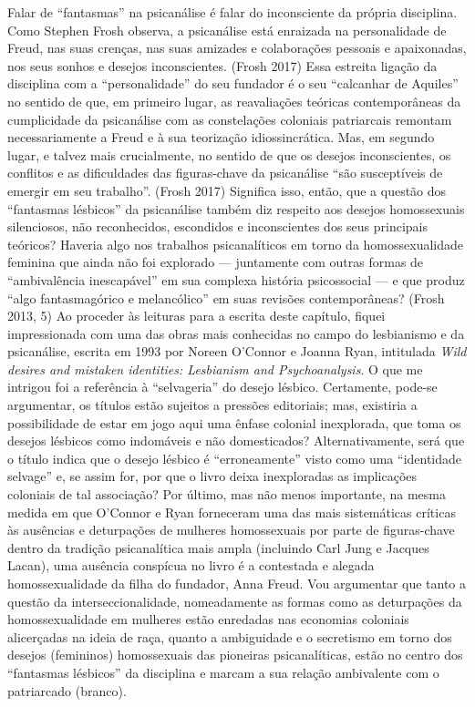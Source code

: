 Falar de ``fantasmas'' na psicanálise é falar do inconsciente da própria
disciplina. Como Stephen Frosh observa, a psicanálise está enraizada na
personalidade de Freud, nas suas crenças, nas suas amizades e
colaborações pessoais e apaixonadas, nos seus sonhos e desejos
inconscientes. (Frosh 2017) Essa estreita ligação da disciplina com a
``personalidade'' do seu fundador é o seu ``calcanhar de Aquiles'' no
sentido de que, em primeiro lugar, as reavaliações teóricas
contemporâneas da cumplicidade da psicanálise com as constelações
coloniais patriarcais remontam necessariamente a Freud e à sua
teorização idiossincrática. Mas, em segundo lugar, e talvez mais
crucialmente, no sentido de que os desejos inconscientes, os conflitos e
as dificuldades das figuras-chave da psicanálise ``são susceptíveis de
emergir em seu trabalho''. (Frosh 2017) Significa isso, então, que a
questão dos ``fantasmas lésbicos'' da psicanálise também diz respeito aos
desejos homossexuais silenciosos, não reconhecidos, escondidos e
inconscientes dos seus principais teóricos? Haveria algo nos trabalhos
psicanalíticos em torno da homossexualidade feminina que ainda não foi
explorado --- juntamente com outras formas de ``ambivalência inescapável''
em sua complexa história psicossocial --- e que produz ``algo
fantasmagórico e melancólico'' em suas revisões contemporâneas? (Frosh
2013, 5) Ao proceder às leituras para a escrita deste capítulo, fiquei
impressionada com uma das obras mais conhecidas no campo do lesbianismo
e da psicanálise, escrita em 1993 por Noreen O'Connor e Joanna Ryan,
intitulada \emph{Wild desires and mistaken identities: Lesbianism and
Psychoanalysis}. O que me intrigou foi a referência à ``selvageria'' do
desejo lésbico. Certamente, pode-se argumentar, os títulos estão
sujeitos a pressões editoriais; mas, existiria a possibilidade de estar
em jogo aqui uma ênfase colonial inexplorada, que toma os desejos
lésbicos como indomáveis e não domesticados? Alternativamente, será que
o título indica que o desejo lésbico é ``erroneamente'' visto como uma
``identidade selvage'' e, se assim for, por que o livro deixa
inexploradas as implicações coloniais de tal associação? Por último, mas
não menos importante, na mesma medida em que O'Connor e Ryan forneceram
uma das mais sistemáticas críticas às ausências e deturpações de
mulheres homossexuais por parte de figuras-chave dentro da tradição
psicanalítica mais ampla (incluindo Carl Jung e Jacques Lacan), uma
ausência conspícua no livro é a contestada e alegada homossexualidade da
filha do fundador, Anna Freud. Vou argumentar que tanto a questão da
interseccionalidade, nomeadamente as formas como as deturpações da
homossexualidade em mulheres estão enredadas nas economias coloniais
alicerçadas na ideia de raça, quanto a ambiguidade e o secretismo em
torno dos desejos (femininos) homossexuais das pioneiras psicanalíticas,
estão no centro dos ``fantasmas lésbicos'' da disciplina e marcam a sua
relação ambivalente com o patriarcado (branco).

